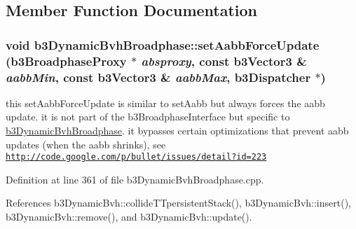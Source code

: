 \subsection{Member Function Documentation}
\hypertarget{structb3_dynamic_bvh_broadphase_c18c206ccd45e8e2f0c817381d6840a0}{
\subsubsection[setAabbForceUpdate]{\setlength{\rightskip}{0pt plus 5cm}void b3DynamicBvhBroadphase::setAabbForceUpdate (b3BroadphaseProxy $\ast$ {\em absproxy}, \/  const b3Vector3 \& {\em aabbMin}, \/  const b3Vector3 \& {\em aabbMax}, \/  b3Dispatcher $\ast$)}}
\label{structb3_dynamic_bvh_broadphase_c18c206ccd45e8e2f0c817381d6840a0}


this setAabbForceUpdate is similar to setAabb but always forces the aabb update. it is not part of the b3BroadphaseInterface but specific to \hyperlink{structb3_dynamic_bvh_broadphase}{b3DynamicBvhBroadphase}. it bypasses certain optimizations that prevent aabb updates (when the aabb shrinks), see \href{http://code.google.com/p/bullet/issues/detail?id=223}{\tt http://code.google.com/p/bullet/issues/detail?id=223} 

Definition at line 361 of file b3DynamicBvhBroadphase.cpp.

References b3DynamicBvh::collideTTpersistentStack(), b3DynamicBvh::insert(), b3DynamicBvh::remove(), and b3DynamicBvh::update().

